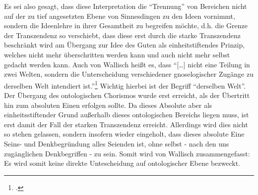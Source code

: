 Es sei also gesagt, dass diese Interpretation die \enquote{Trennung} von Bereichen nicht auf der zu tief angesetzten Ebene von Sinnesdingen zu den Ideen vornimmt, sondern die Ideenlehre in ihrer Gesamtheit zu begreifen möchte, d.h. die Grenze der Transzendenz so verschiebt, dass diese erst durch die starke Transzendenz beschränkt wird am Übergang zur Idee des Guten als einheitstiftendes Prinzip, welches nicht mehr überschritten werden kann und auch nicht mehr selbst gedacht werden kann. 
Auch von Wallisch heißt es, dass \enquote{[\dots] nicht eine Teilung in zwei Welten, sondern die Unterscheidung verschiedener gnoselogischer Zugänge zu derselben Welt intendiert ist.}\footcite[vgl.][S. 15]{Wallisch}
Wichtig hierbei ist der Begriff \enquote{derselben Welt}. Der Übergang des ontologischen Chorismos wurde erst erreicht, als der Übertritt hin zum absoluten Einen erfolgen sollte. Da dieses Absolute aber als einheitsstiftender Grund außerhalb dieses ontologischen Bereichs liegen muss, ist erst damit der Fall der starken Transzendenz erreicht. Allerdings wird dies nicht so stehen gelassen, sondern insofern wieder eingeholt, dass dieses absolute Eine Seins- und Denkbegründung alles Seienden ist, ohne selbst - nach den uns zugänglichen Denkbegriffen - zu sein. Somit wird von Wallisch zusammengefasst:
 Es wird somit keine direkte Untescheidung auf ontologischer Ebene bezweckt. 
